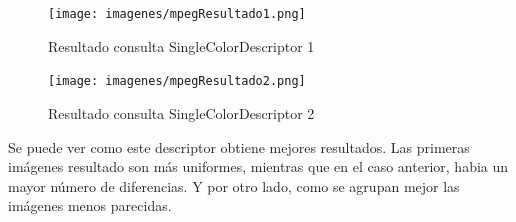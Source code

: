\begin{figure}[H] %
\centering
\texttt{[image: imagenes/mpegResultado1.png]}  %
\label{mpegResultado1.png}
\caption{Resultado consulta SingleColorDescriptor 1 }
\end{figure}

\begin{figure}[H] %
\centering
\texttt{[image: imagenes/mpegResultado2.png]}  %
\label{mpegResultado1.png}
\caption{Resultado consulta SingleColorDescriptor 2 }
\end{figure}

Se puede ver como este descriptor obtiene mejores resultados. Las primeras imágenes resultado son más uniformes, mientras que en el caso anterior, habia un mayor número de diferencias. Y por otro lado, como se agrupan mejor las imágenes menos parecidas.






